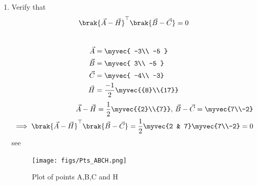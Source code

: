 \documentclass[11pt]{book}
\begin{document}
\begin{enumerate}[label=\thesection.\arabic*.,ref=\thesection.\theenumi]
\item Verify that 
		\begin{align}
			\brak{\vec{A}-\vec{H}}^{\top}\brak{\vec{B}-\vec{C}} = 0
		\end{align}
\\  \solution
 \begin{align} 
 \vec{A} &= \myvec{ -3\\ -5 } \\ \vec{B} &= \myvec{ 3\\ -5 }
  \\\vec{C} &= \myvec{ -4\\ -3} \\ \vec{H} &=\frac{-1}{2}\myvec{{8}\\{17}}
 \end{align}
\begin{align}
\vec{A}-\vec{H}=\frac{1}{2}\myvec{{2}\\{7}},\,
\vec{B}-\vec{C}=\myvec{7\\-2}
\\
	\implies \brak{\vec{A}-\vec{H}}^{\top}\brak{\vec{B}-\vec{C}}=\frac{1}{2}\myvec{2 & 7}
\myvec{7\\-2}
=0
\end{align}
see 
\begin{figure}
    \centering
    \texttt{[image: figs/Pts\_ABCH.png]}
    \caption{Plot of points A,B,C and H}
    \label{fig:Pts_ABCH}
\end{figure}



\end{enumerate}
\end{document}
